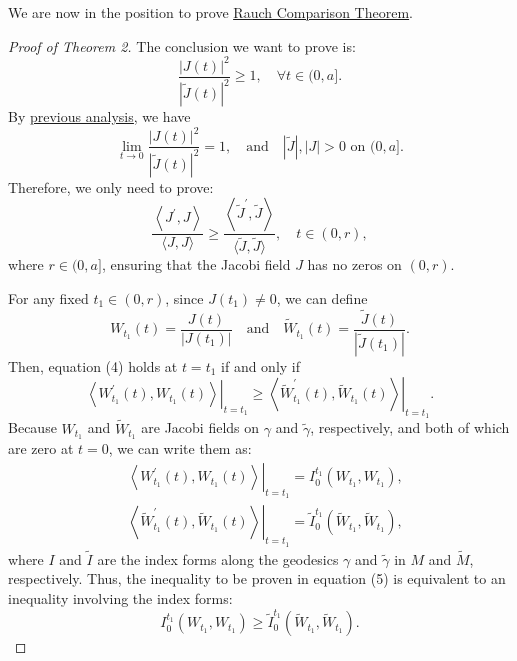 \documentclass{ctexart}
\begin{document}
We are now in the position to prove \underline{\hyperref[RCT]{Rauch Comparison Theorem}}.
\begin{proof}[Proof of Theorem 2]
  The conclusion we want to prove is:
  $$
  \frac{|J(t)|^2}{|\tilde{J}(t)|^2} \geq 1, \quad \forall t \in (0, a].
  $$
  By \underline{\hyperlink{GSpre}{previous analysis}}, we have 
  $$
  \lim _{t \rightarrow 0} \frac{|J(t)|^2}{|\tilde{J}(t)|^2}=1, \quad \text{and} \quad |\tilde{J}|, |J| > 0 \text{ on } (0, a].
  $$
  Therefore, we only need to prove:
  \begin{equation}
    \frac{\left\langle J^{\prime}, J\right\rangle}{\langle J, J\rangle} \geq \frac{\left\langle\tilde{J}^{\prime}, \tilde{J}\right\rangle}{\langle\tilde{J}, \tilde{J}\rangle}, \quad t \in (0, r),
  \end{equation}
  where $r \in (0, a]$, ensuring that the Jacobi field $J$ has no zeros on $(0, r)$.
  
  For any fixed $t_1 \in (0, r)$, since $J(t_1) \neq 0$, we can define
  $$
  W_{t_1}(t) = \frac{J(t)}{\left|J(t_1)\right|} \quad \text{and} \quad \tilde{W}_{t_1}(t) = \frac{\tilde{J}(t)}{\left|\tilde{J}(t_1)\right|}.
  $$
  Then, equation (4) holds at $t = t_1$ if and only if
  \begin{equation}
    \left.\left\langle W_{t_1}^{\prime}(t), W_{t_1}(t)\right\rangle\right|_{t=t_1} \geq \left.\left\langle\tilde{W}_{t_1}^{\prime}(t), \tilde{W}_{t_1}(t)\right\rangle\right|_{t=t_1}.
  \end{equation}
  Because $W_{t_1}$ and $\tilde{W}_{t_1}$ are Jacobi fields on $\gamma$ and $\tilde{\gamma}$, respectively, and both of which are zero at $t = 0$, we can write them as:
  $$
  \begin{aligned}
  & \left.\left\langle W_{t_1}^{\prime}(t), W_{t_1}(t)\right\rangle\right|_{t=t_1}=I_0^{t_1}\left(W_{t_1}, W_{t_1}\right), \\
  & \left.\left\langle\tilde{W}_{t_1}^{\prime}(t), \tilde{W}_{t_1}(t)\right\rangle\right|_{t=t_1}=\tilde{I}_0^{t_1}\left(\tilde{W}_{t_1}, \tilde{W}_{t_1}\right),
  \end{aligned}
  $$
  where $I$ and $\tilde{I}$ are the index forms along the geodesics $\gamma$ and $\tilde{\gamma}$ in $M$ and $\tilde{M}$, respectively. 
  Thus, the inequality to be proven in equation (5) is equivalent to an inequality involving the index forms:
  $$
  I_0^{t_1}\left(W_{t_1}, W_{t_1}\right) \geq \tilde{I}_0^{t_1}\left(\tilde{W}_{t_1}, \tilde{W}_{t_1}\right).
  $$


\end{proof}
\end{document}
